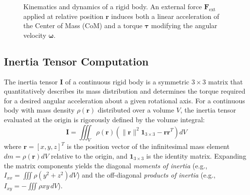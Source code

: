 \begin{figure}[htbp]
    \centering
    \caption{Kinematics and dynamics of a rigid body. An external force $\bm{F}_{\text{ext}}$ applied at relative position $\bm{r}$ induces both a linear acceleration of the Center of Mass (CoM) and a torque $\bm{\tau}$ modifying the angular velocity $\bm{\omega}$.}
    \label{fig:rigid_body}
\end{figure}

\subsection{Inertia Tensor Computation}
The inertia tensor $\bm{I}$ of a continuous rigid body is a symmetric $3 \times 3$ matrix that quantitatively describes its mass distribution and determines the torque required for a desired angular acceleration about a given rotational axis. For a continuous body with mass density $\rho(\bm{r})$ distributed over a volume $V$, the inertia tensor evaluated at the origin is rigorously defined by the volume integral:
\begin{equation}
    \bm{I} = \iiint_V \rho(\bm{r}) \left( \|\bm{r}\|^2 \bm{1}_{3\times3} - \bm{r}\bm{r}^T \right) dV
\end{equation}
where $\bm{r} = [x, y, z]^T$ is the position vector of the infinitesimal mass element $dm = \rho(\bm{r}) dV$ relative to the origin, and $\bm{1}_{3\times3}$ is the identity matrix. Expanding the matrix components yields the diagonal \textit{moments of inertia} (e.g., $I_{xx} = \iiint \rho (y^2 + z^2) dV$) and the off-diagonal \textit{products of inertia} (e.g., $I_{xy} = -\iiint \rho xy \, dV$). 

